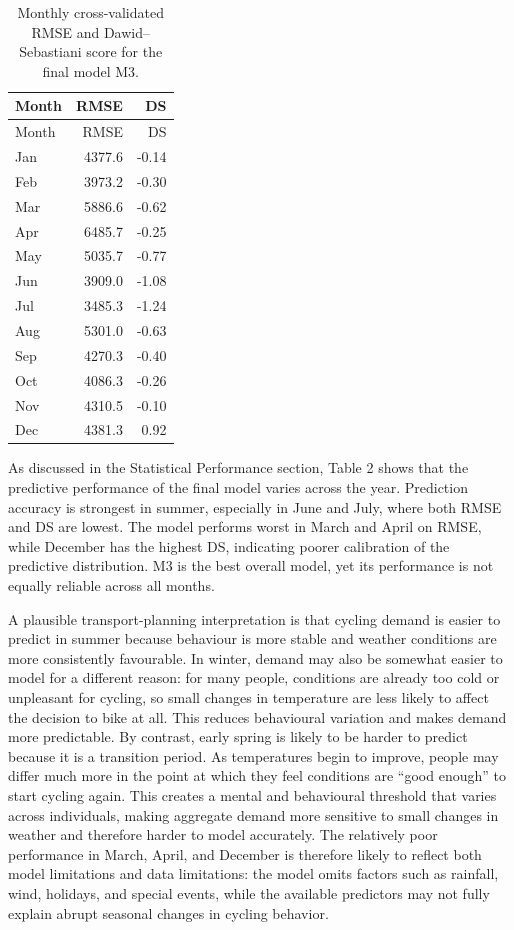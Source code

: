 \documentclass[
]{article}
\begin{document}
\begin{longtable}[]{@{}lrr@{}}
\caption{Monthly cross-validated RMSE and Dawid--Sebastiani score for
the final model M3.}\tabularnewline
\toprule\noalign{}
Month & RMSE & DS \\
\midrule\noalign{}
\endfirsthead
\toprule\noalign{}
Month & RMSE & DS \\
\midrule\noalign{}
\endhead
\bottomrule\noalign{}
\endlastfoot
Jan & 4377.6 & -0.14 \\
Feb & 3973.2 & -0.30 \\
Mar & 5886.6 & -0.62 \\
Apr & 6485.7 & -0.25 \\
May & 5035.7 & -0.77 \\
Jun & 3909.0 & -1.08 \\
Jul & 3485.3 & -1.24 \\
Aug & 5301.0 & -0.63 \\
Sep & 4270.3 & -0.40 \\
Oct & 4086.3 & -0.26 \\
Nov & 4310.5 & -0.10 \\
Dec & 4381.3 & 0.92 \\
\end{longtable}

As discussed in the Statistical Performance section, Table 2 shows that
the predictive performance of the final model varies across the year.
Prediction accuracy is strongest in summer, especially in June and July,
where both RMSE and DS are lowest. The model performs worst in March and
April on RMSE, while December has the highest DS, indicating poorer
calibration of the predictive distribution. M3 is the best overall
model, yet its performance is not equally reliable across all months.

A plausible transport-planning interpretation is that cycling demand is
easier to predict in summer because behaviour is more stable and weather
conditions are more consistently favourable. In winter, demand may also
be somewhat easier to model for a different reason: for many people,
conditions are already too cold or unpleasant for cycling, so small
changes in temperature are less likely to affect the decision to bike at
all. This reduces behavioural variation and makes demand more
predictable. By contrast, early spring is likely to be harder to predict
because it is a transition period. As temperatures begin to improve,
people may differ much more in the point at which they feel conditions
are ``good enough'' to start cycling again. This creates a mental and
behavioural threshold that varies across individuals, making aggregate
demand more sensitive to small changes in weather and therefore harder
to model accurately. The relatively poor performance in March, April,
and December is therefore likely to reflect both model limitations and
data limitations: the model omits factors such as rainfall, wind,
holidays, and special events, while the available predictors may not
fully explain abrupt seasonal changes in cycling behavior.
\end{document}
